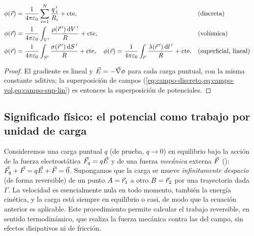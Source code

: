 \begin{proposicion}\label{prop:potencial-dist}
\begin{align}
  \phi(\vec{r})&=\frac{1}{4\pi\varepsilon_{0}}\sum_{i=1}^{N}\frac{q\,'_i}{R_i}+\text{cte}, &&\text{(discreta)}\label{eq:pot-discreto}\\
  \phi(\vec{r})&=\frac{1}{4\pi\varepsilon_{0}}\int_{V'}\frac{\rho(\vec{r}\,')\,\mathrm{d} V\,'}{R}+\text{cte}, &&\text{(volúmica)}\label{eq:pot-vol}\\
  \phi(\vec{r})&=\frac{1}{4\pi\varepsilon_{0}}\int_{S'}\frac{\sigma(\vec{r}\,')\,\mathrm{d} S\,'}{R}+\text{cte}, \quad
  \phi(\vec{r})=\frac{1}{4\pi\varepsilon_{0}}\int_{l'}\frac{\lambda(\vec{r}\,')\,\mathrm{d} l\,'}{R}+\text{cte}. &&\text{(superficial, lineal)}\label{eq:pot-sup-lin}
\end{align}
\end{proposicion}
\begin{proof}
El gradiente es lineal y $\vec{E}=-\vec{\nabla}\phi$ para cada carga puntual, con la misma constante aditiva; la superposición de campos
(\cref{eq:campo-discreto,eq:campo-vol,eq:campo-sup-lin}) es entonces la superposición de potenciales.
\end{proof}

\subsection{Significado físico: el potencial como trabajo por unidad de carga}\label{sec:potencial-signif}
Consideremos una carga puntual $q$ (de prueba, $q\to0$) en equilibrio bajo la acción de la fuerza electrostática $\vec{F}_q=q\vec{E}$ y de
una fuerza \emph{mecánica} externa $\vec{F}$ (): $\vec{F}_q+\vec{F}=q\vec{E}+\vec{F}=\vec{0}$. Supongamos que la carga se mueve
\emph{infinitamente despacio} (de forma reversible) de un punto $A=\vec{r}_1$ a otro $B=\vec{r}_2$ por una trayectoria dada $\Gamma$. La
velocidad es esencialmente nula en todo momento, también la energía cinética, y la carga está siempre en equilibrio o casi, de modo que la
ecuación anterior es aplicable. Este procedimiento permite calcular el trabajo reversible, en sentido termodinámico, que realiza la fuerza
mecánica contra las del campo, sin efectos disipativos ni de fricción.



